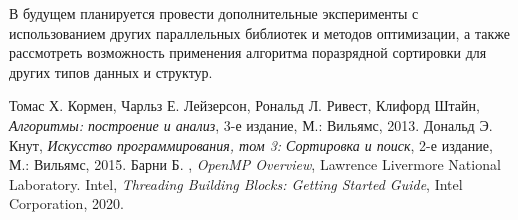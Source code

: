 \documentclass[]{article}
\theoremstyle{remark}
\theoremstyle{definition}
\begin{document}
\par В будущем планируется провести дополнительные эксперименты с использованием других параллельных библиотек и методов оптимизации, а также рассмотреть возможность применения алгоритма поразрядной сортировки для других типов данных и структур. 

\newpage

\begin{thebibliography}{9}
    Томас Х. Кормен, Чарльз Е. Лейзерсон, Рональд Л. Ривест, Клифорд Штайн,
    \textit{Алгоритмы: построение и анализ},
    3-е издание, М.: Вильямс, 2013.
    Дональд Э. Кнут,
    \textit{Искусство программирования, том 3: Сортировка и поиск},
    2-е издание, М.: Вильямс, 2015.
    Барни Б. ,
    \textit{OpenMP Overview},
    Lawrence Livermore National Laboratory.
    Intel,
    \textit{Threading Building Blocks: Getting Started Guide},
    Intel Corporation, 2020.
\end{thebibliography}
\end{document}

